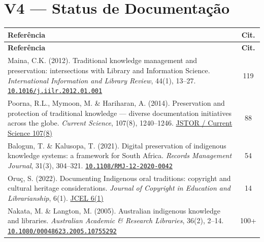 \documentclass[a4paper,11pt]{article}
\newcommand{\doi}[1]{\href{https://doi.org/#1}{\texttt{#1}}}
\begin{document}
\section{V4 --- Status de Documentação}

\begin{longtable}{>{\raggedright\arraybackslash}p{} c}
\toprule
\textbf{Referência} & \textbf{Cit.} \\
\midrule
\endfirsthead
\toprule
\textbf{Referência} & \textbf{Cit.} \\
\midrule
\endhead

Maina, C.K. (2012). Traditional knowledge management and preservation: intersections with Library and Information Science. \textit{International Information and Library Review}, 44(1), 13--27.\newline
\doi{10.1016/j.iilr.2012.01.001} & 119 \\
\addlinespace

Poorna, R.L., Mymoon, M. \& Hariharan, A. (2014). Preservation and protection of traditional knowledge --- diverse documentation initiatives across the globe. \textit{Current Science}, 107(8), 1240--1246.\newline
\href{https://www.jstor.org/stable/24103468}{JSTOR / Current Science 107(8)} & 88 \\
\addlinespace

Balogun, T. \& Kalusopa, T. (2021). Digital preservation of indigenous knowledge systems: a framework for South Africa. \textit{Records Management Journal}, 31(3), 304--321.\newline
\doi{10.1108/RMJ-12-2020-0042} & 54 \\
\addlinespace

Oruç, S. (2022). Documenting Indigenous oral traditions: copyright and cultural heritage considerations. \textit{Journal of Copyright in Education and Librarianship}, 6(1).\newline
\href{https://doi.org/10.17161/jcel.v6i1}{JCEL 6(1)} & 14 \\
\addlinespace

Nakata, M. \& Langton, M. (2005). Australian indigenous knowledge and libraries. \textit{Australian Academic \& Research Libraries}, 36(2), 2--14.\newline
\doi{10.1080/00048623.2005.10755292} & 100+ \\

\bottomrule
\end{longtable}
\end{document}
